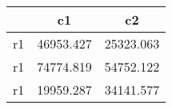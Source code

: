 \begin{table}[htbp]
\begin{tabular}{lcc} \hline \hline
 & c1  & c2  \\  \hline 
r1 & 46953.427 & 25323.063 \\  
r1 & 74774.819 & 54752.122 \\  
r1 & 19959.287 & 34141.577 \\  
\hline \hline \end{tabular}
\end{table}
